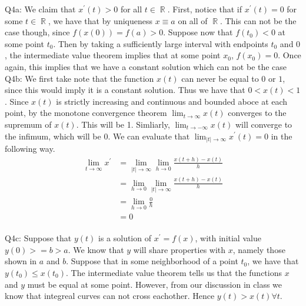 \documentclass[letterpaper]{article}
\DeclareMathOperator{\R}{\mathbb{R}}
\DeclareMathOperator{\Q}{\mathbb{Q}}
\begin{document}
\noindent Q4a: We claim that $x^\prime(t)>0$ for all $t\in \R$. First, notice that if $x^\prime(t)=0$ for some $t\in\R$, we have that by uniqueness $x\equiv a$ on all of $\R$. This can not be the case though, since $f(x(0))=f(a)>0$. Suppose now that $f(t_0)<0$ at some point $t_0$. Then by taking a sufficiently large interval with endpoints $t_0$ and $0$, the intermediate value theorem implies that at some point $x_0$, $f(x_0)=0$. Once again, this implies that we have a constant solution which can not be the case
\newline \\Q4b:  We first take note that the function $x(t)$ can never  be equal to $0$ or $1$, since this would imply it is a constant solution. Thus we have that $0<x(t)<1$. Since $x(t)$ is strictly increasing and continuous and bounded aboce at each point, by the monotone convergence theorem $\lim_{t \to \infty}x(t)$ converges to the supremum of $x(t)$. This will be 1. Simliarly, $\lim_{t\to -\infty}x(t)$ will converge to the infimum, which will be 0. 
We can evaluate that $\lim_{|t| \to \infty} x^\prime(t)=0$ in the following way. 
\begin{align*}
    \lim_{t\to \infty} x^\prime & = \lim_{|t|\to \infty} \lim_{h\to 0} \frac{x(t+h)-x(t)}{h}
    \\ & = \lim_{h\to 0} \lim_{|t|\to \infty} \frac{x(t+h)-x(t)}{h}
    \\ & = \lim_{h\to 0} \frac{0}{h}
    \\ & =0
\end{align*}
\newline \\ Q4c: Suppose that $y(t)$ is a solution of $x^\prime = f(x)$, with initial value $y(0)>=b>a$. We know that $y$ will share properties with $x$, namely those shown in $a$ and $b$.
Suppose that in some neighborhood of a point $t_0$, we have that $y(t_0)\leq x(t_0)$. The intermediate value theorem tells us that the functions $x$ and $y$ must be equal at some point. However, from our discussion in class we know that integreal curves can not cross eachother. Hence $y(t)>x(t) \forall t$. 
\end{document}
